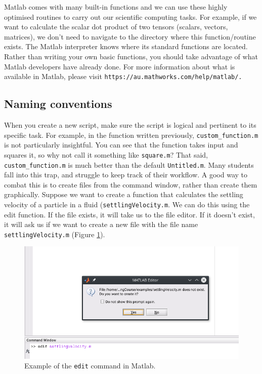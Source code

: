 \documentclass[12pt]{article}
\begin{document}
Matlab comes with many built-in functions and we can use these highly optimised routines to carry out our scientific computing tasks. For example, if we want to calculate the scalar dot product of two tensors (scalars, vectors, matrices), we don't need to navigate to the directory where this function/routine exists. The Matlab interpreter knows where its standard functions are located. Rather than writing your own basic functions, you should take advantage of what Matlab developers have already done. For more information about what is available in Matlab, please visit \texttt{https://au.mathworks.com/help/matlab/.}

\subsection{Naming conventions}
When you create a new script, make sure the script is logical and pertinent to its specific task. For example, in the function written previously, \texttt{custom\_function.m} is not particularly insightful. You can see that the function takes input and squares it, so why not call it something like \texttt{square.m}? That said, \texttt{custom\_function.m} is much better than the default \texttt{Untitled.m}. Many students fall into this trap, and struggle to keep track of their workflow. A good way to combat this is to create files from the command window, rather than create them graphically. Suppose we want to create a function that calculates the settling velocity of a particle in a fluid (\texttt{settlingVelocity.m}. We can do this using the edit function. If the file exists, it will take us to the file editor. If it doesn't exist, it will ask us if we want to create a new file with the file name \texttt{settlingVelocity.m} (Figure \ref{fig:edit_command}).

\begin{figure}[ht]
\centering
\includegraphics[scale=0.8]{touch.png}
\caption{Example of the \texttt{edit} command in Matlab.}
\label{fig:edit_command}
\end{figure}
\end{document}
